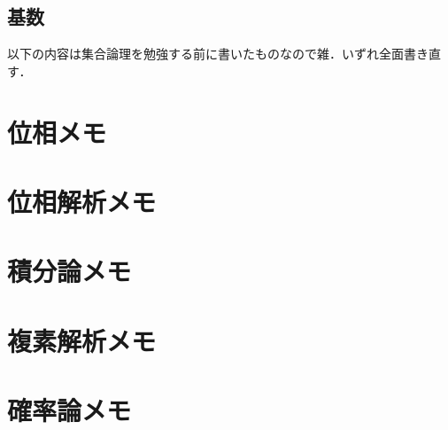 \documentclass[a4j,10.5pt,oneside,openany]{jsbook}
\theoremstyle{mystyle}
\begin{document}
	\section{基数}
		
		

\newpage	
以下の内容は集合論理を勉強する前に書いたものなので雑．いずれ全面書き直す．
\chapter{位相メモ}
	
	
	
	
	
	
	
	
	

\chapter{位相解析メモ}
	
	

\chapter{積分論メモ}
	
	
	
	
	
	
	

\chapter{複素解析メモ}
	
	
	
%

\chapter{確率論メモ}
	
	
	
	
	
	
	
	
	
	

%	

\newpage
\printindex

%
%
\end{document}
